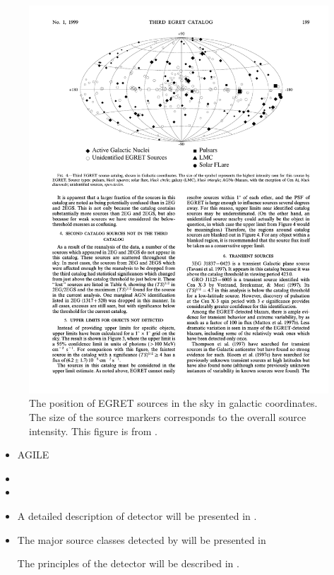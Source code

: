 \begin{figure}[htb]
\centering
\includegraphics{chapters/introduction/figures/third_egret_catalog_sources.pdf}
\caption{The position of \ac{EGRET} sources in the sky in galactic
coordinates.  The size of the source markers corresponds to the overall
source intensity.  This figure is from \citep{hartman_1999a_third-egret}.}
\end{figure}


\begin{itemize}
  \item AGILE
\item \fermi
  \item {}

  \item A detailed description of \fermi detector will be presented in .
  \item The major source classes detected by \fermi will be presented in  


  The principles of the detector will be described in .
\end{itemize}



